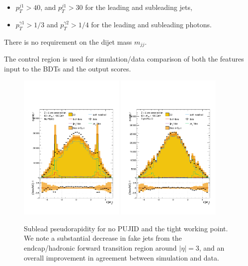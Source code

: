 \begin{itemize}[leftmargin=.5in,noitemsep]
    \item $p_{T}^{j1} > 40$, and $p_{T}^{j1} > 30$ for the leading and subleading jets,
    \item $p_{T}^{\gamma{1}} > 1/3$ and $p_{T}^{\gamma{2}} > 1/4$ for the leading and subleading photons.
\end{itemize}
There is no requirement on the dijet mass $m_{jj}$. 

The control region is used for simulation/data comparison of both the features input to the BDTs and the output scores. 

\begin{figure}[h!]
    \begin{center}
        \includegraphics[width=0.45\textwidth]{figures/event_selection/stack_histogram_dijet_subleadEta_zplus2j_none_inclusive_.pdf}
        \includegraphics[width=0.45\textwidth]{figures/event_selection/stack_histogram_dijet_subleadEta_zplus2j_tight_inclusive_.pdf}
    \end{center}
    \caption{Sublead pseudorapidity for no PUJID and the tight working point. We note a substantial decrease in fake jets from the endcap/hadronic forward transition region around $|\eta|=3$, and an overall improvement in agreement between simulation and data.}
    \label{fig:event_categorisaton:sublead_eta_pujid}
\end{figure}








